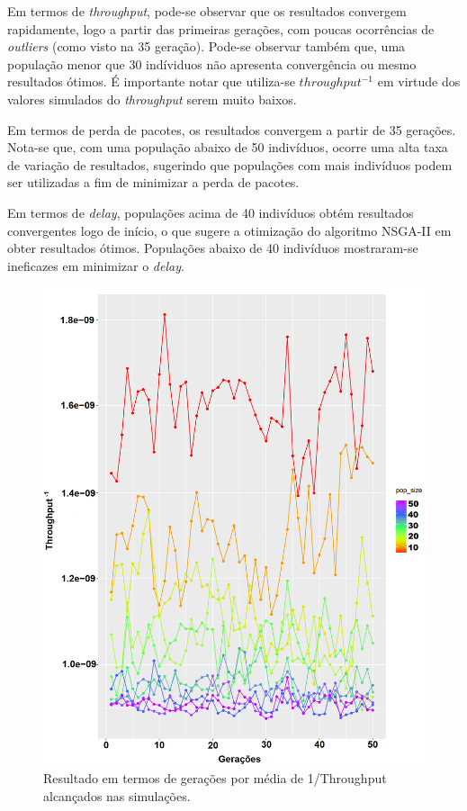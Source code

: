 \documentclass[conference]{IEEEtran}
\begin{document}
Em termos de \textit{throughput}, pode-se observar que os resultados convergem rapidamente, logo a partir das primeiras gerações, com poucas ocorrências de \textit{outliers} (como visto na 35 geração).
Pode-se observar também que, uma população menor que 30 indíviduos não apresenta convergência ou mesmo resultados ótimos. É importante notar que utiliza-se $throughput^{-1}$ em virtude dos valores simulados do \textit{throughput} serem muito baixos.

Em termos de perda de pacotes, os resultados convergem a partir de 35 gerações. Nota-se que, com uma população abaixo de 50 indivíduos, ocorre uma alta taxa de variação de resultados, sugerindo que populações com mais indivíduos podem ser utilizadas a fim de minimizar a perda de pacotes.

Em termos de \textit{delay}, populações acima de 40 indivíduos obtém resultados convergentes logo de início, o que sugere a otimização do algoritmo NSGA-II em obter resultados ótimos.
Populações abaixo de 40 indivíduos mostraram-se ineficazes em minimizar o \textit{delay}.

\begin{figure}[t]
  \centering
  \includegraphics[scale=0.24]{figures/GeracoesXThroughput.png}
  \caption{Resultado em termos de gerações por média de 1/Throughput alcançados nas simulações.}
  \label{fig:result-throughput}
\end{figure}
\end{document}
